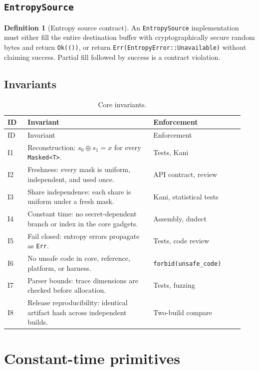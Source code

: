 \documentclass[11pt,a4paper]{article}
\newcommand{\code}[1]{\texttt{#1}}
\theoremstyle{plain}
\theoremstyle{definition}
\newtheorem{definition}[theorem]{Definition}
\theoremstyle{remark}
\begin{document}
\subsection{\code{EntropySource}}

\begin{definition}[Entropy source contract]\label{def:entropy}
An \code{EntropySource} implementation must either fill the entire destination buffer
with cryptographically secure random bytes and return \code{Ok(())}, or return
\code{Err(EntropyError::Unavailable)} without claiming success. Partial fill followed
by success is a contract violation.
\end{definition}

\subsection{Invariants}

\begin{longtable}{@{}p{0.08\linewidth}p{0.50\linewidth}p{0.36\linewidth}@{}}
\caption{Core invariants.}\label{tab:invariants}\\
\toprule
ID & Invariant & Enforcement \\
\midrule
\endfirsthead
\toprule
ID & Invariant & Enforcement \\
\midrule
\endhead
I1 & Reconstruction: \(s_0\oplus s_1=x\) for every \code{Masked<T>}. & Tests, Kani \\
I2 & Freshness: every mask is uniform, independent, and used once. & API contract, review \\
I3 & Share independence: each share is uniform under a fresh mask. & Kani, statistical tests \\
I4 & Constant time: no secret-dependent branch or index in the core gadgets. & Assembly, dudect \\
I5 & Fail closed: entropy errors propagate as \code{Err}. & Tests, code review \\
I6 & No unsafe code in core, reference, platform, or harness. & \code{forbid(unsafe\_code)} \\
I7 & Parser bounds: trace dimensions are checked before allocation. & Tests, fuzzing \\
I8 & Release reproducibility: identical artifact hash across independent builds. & Two-build compare \\
\bottomrule
\end{longtable}

\section{Constant-time primitives}\label{sec:ct}
\end{document}
